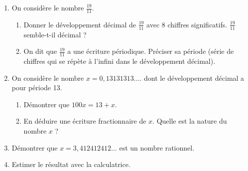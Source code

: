 
\begin{enumerate}
\item On considère le nombre $\frac{19}{11}$.

\begin{enumerate}
\item Donner le développement décimal de $\frac{19}{11}$ avec 8 chiffres significatifs. $\frac{19}{11}$ semble-t-il décimal ?
\item On dit que $\frac{19}{11}$ a une écriture périodique.
Préciser sa période (série de chiffres qui se répète à l'infini dans le développement décimal).
\end{enumerate}
\item On considère le nombre $x=0,13131313....$ dont le développement décimal a pour période 13.
\begin{enumerate}
\item Démontrer que $100x = 13 + x$. 
\item  En déduire une écriture fractionnaire de $x$. Quelle est la nature du nombre $x$ ?
\end{enumerate}
\item Démontrer que $x=3,412412412...$ est un nombre rationnel. 
\item Estimer le résultat avec la calculatrice.
\end{enumerate}

 
